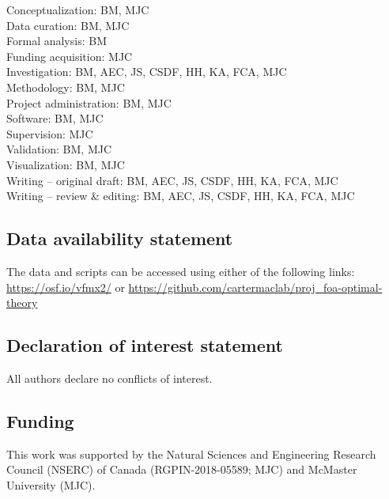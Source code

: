 \documentclass[man,floatsintext,letterpaper,12pt]{apa7}
\begin{document}
\noindent Conceptualization: BM, MJC\\
\noindent Data curation: BM, MJC\\
\noindent Formal analysis: BM\\
\noindent Funding acquisition: MJC\\
\noindent Investigation: BM, AEC, JS, CSDF, HH, KA, FCA, MJC\\
\noindent Methodology: BM, MJC\\
\noindent Project administration: BM, MJC\\
\noindent Software: BM, MJC\\
\noindent Supervision: MJC\\
\noindent Validation: BM, MJC\\
\noindent Visualization: BM, MJC\\
\noindent Writing -- original draft: BM, AEC, JS, CSDF, HH, KA, FCA, MJC\\
\noindent Writing -- review \& editing: BM, AEC, JS, CSDF, HH, KA, FCA, MJC

\subsection{Data availability statement}

\noindent The data and scripts can be accessed using either of the following links: \url{https://osf.io/vfmx2/} or \url{https://github.com/cartermaclab/proj_foa-optimal-theory}

\subsection{Declaration of interest statement}

\noindent All authors declare no conflicts of interest.

\subsection{Funding}

\noindent This work was supported by the Natural Sciences and Engineering Research Council (NSERC) of Canada (RGPIN-2018-05589; MJC) and McMaster University (MJC).
\end{document}
